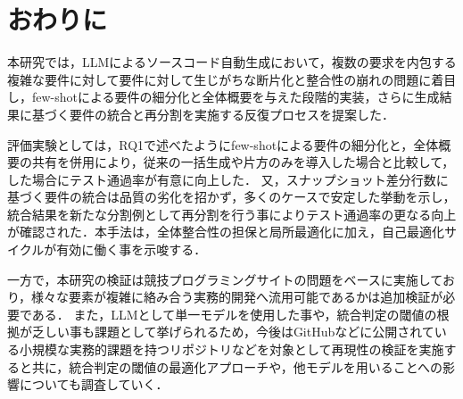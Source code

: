 \documentclass[submit,techrep,noauthor]{ipsj}
\begin{document}

\section{おわりに}
\label{sec:conclusion}
本研究では，LLMによるソースコード自動生成において，複数の要求を内包する複雑な要件に対して要件に対して生じがちな断片化と整合性の崩れの問題に着目し，few-shotによる要件の細分化と全体概要を与えた段階的実装，さらに生成結果に基づく要件の統合と再分割を実施する反復プロセスを提案した．

評価実験としては，RQ1で述べたようにfew-shotによる要件の細分化と，全体概要の共有を併用により，従来の一括生成や片方のみを導入した場合と比較して，した場合にテスト通過率が有意に向上した．
又，スナップショット差分行数に基づく要件の統合は品質の劣化を招かず，多くのケースで安定した挙動を示し，統合結果を新たな分割例として再分割を行う事によりテスト通過率の更なる向上が確認された．本手法は，全体整合性の担保と局所最適化に加え，自己最適化サイクルが有効に働く事を示唆する．

一方で，本研究の検証は競技プログラミングサイトの問題をベースに実施しており，様々な要素が複雑に絡み合う実務的開発へ流用可能であるかは追加検証が必要である．
また，LLMとして単一モデルを使用した事や，統合判定の閾値の根拠が乏しい事も課題として挙げられるため，今後はGitHubなどに公開されている小規模な実務的課題を持つリポジトリなどを対象として再現性の検証を実施すると共に，統合判定の閾値の最適化アプローチや，他モデルを用いることへの影響についても調査していく．




\end{document}
